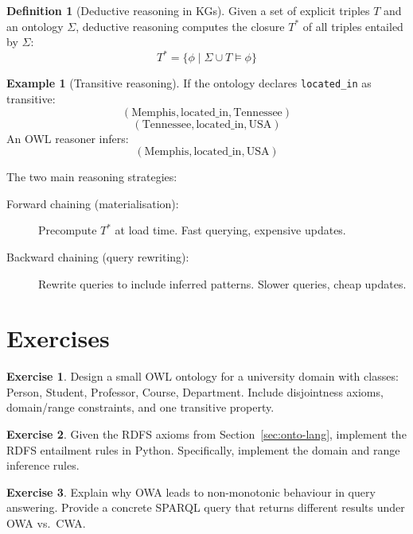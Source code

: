\documentclass[11pt,a4paper,oneside,openany]{book}
\theoremstyle{definition}
\newtheorem{definition}{Definition}[chapter]
\newtheorem{example}{Example}[chapter]
\newtheorem{exercise}{Exercise}[chapter]
\theoremstyle{plain}
\theoremstyle{remark}
\begin{document}
\begin{definition}[Deductive reasoning in KGs]
	Given a set of explicit triples $T$ and an ontology $\Sigma$, deductive reasoning computes the closure $T^*$ of all triples entailed by $\Sigma$:
	$$T^* = \{ \phi \mid \Sigma \cup T \models \phi \}$$
\end{definition}

\begin{example}[Transitive reasoning]
	If the ontology declares \texttt{located\_in} as transitive:
	$$(\text{Memphis}, \text{located\_in}, \text{Tennessee})$$
	$$(\text{Tennessee}, \text{located\_in}, \text{USA})$$
	An OWL reasoner infers:
	$$(\text{Memphis}, \text{located\_in}, \text{USA})$$
\end{example}

The two main reasoning strategies:
\begin{description}
	\item[Forward chaining (materialisation):] Precompute $T^*$ at load time. Fast querying, expensive updates.
	\item[Backward chaining (query rewriting):] Rewrite queries to include inferred patterns. Slower queries, cheap updates.
\end{description}

\section{Exercises}

\begin{exercise}
	Design a small OWL ontology for a university domain with classes: Person, Student, Professor, Course, Department. Include disjointness axioms, domain/range constraints, and one transitive property.
\end{exercise}

\begin{exercise}
	Given the RDFS axioms from Section~\ref{sec:onto-lang}, implement the RDFS entailment rules in Python. Specifically, implement the domain and range inference rules.
\end{exercise}

\begin{exercise}
	Explain why OWA leads to non-monotonic behaviour in query answering. Provide a concrete SPARQL query that returns different results under OWA vs.\ CWA.
\end{exercise}

\end{document}
